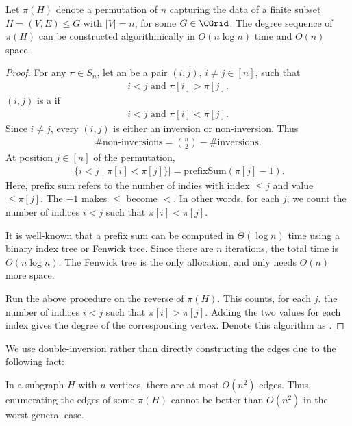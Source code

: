 \begin{theorem}
\label{thm:subset-alg}
Let $\pi(H)$ denote a permutation of $n$ capturing the data of a finite subset $H = (V,E) \leq G$ with $|V|=n$, for some $G \in \CGrid$. The degree sequence of $\pi(H)$ can be constructed algorithmically in $O(n \log n)$ time and $O(n)$ space.
\begin{proof}
For any $\pi \in S_n$, let an  be a pair $(i,j)$, $i \neq j \in [n]$, such that 
\begin{align}
    i < j \text{ and } \pi[i] > \pi[j].
\end{align}
$(i,j)$ is a  if
\begin{align}
    i < j \text{ and } \pi[i] < \pi[j].
\end{align}
Since $i \neq j$, every $(i,j)$ is either an inversion or non-inversion. Thus
\begin{align}
    \#\text{non-inversions} = \binom{n}{2} - \#\text{inversions}.
\end{align}
At position $j \in [n]$ of the permutation, 
\begin{align}
    |\{i < j \mid \pi[i] < \pi[j]\}| = \text{prefixSum}(\pi[j] - 1).
\end{align}
Here, prefix sum refers to the number of indies with index $\leq j$ and value $\leq \pi[j]$. The $-1$ makes $\leq$ become $<$. In other words, for each $j$, we count the number of indices $i < j$ such that $\pi[i] < \pi[j]$.

It is well-known that a prefix sum can be computed in $\Theta(\log n)$ time using a binary index tree or Fenwick tree. Since there are $n$ iterations, the total time is $\Theta(n \log n)$. The Fenwick tree is the only allocation, and only needs $\Theta(n)$ more space.

Run the above procedure on the reverse of $\pi(H)$. This counts, for each $j$. the number of indices $i < j$ such that $\pi[i] > \pi[j]$. Adding the two values for each index gives the degree of the corresponding vertex. Denote this algorithm as .
\end{proof}
\end{theorem}

We use double-inversion rather than directly constructing the edges due to the following fact:

\begin{fact}
In a subgraph $H$ with $n$ vertices, there are at most $O(n^2)$ edges. Thus, enumerating the edges of some $\pi(H)$ cannot be better than $O(n^2)$ in the worst general case.
\end{fact}

